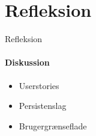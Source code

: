 \section{Refleksion}

\begin{frame}{Refleksion}
\framesubtitle{Diskussion}
\begin{itemize}
\item Userstories
\item Persistenslag
\item Brugergrænseflade
\end{itemize}
\end{frame}


